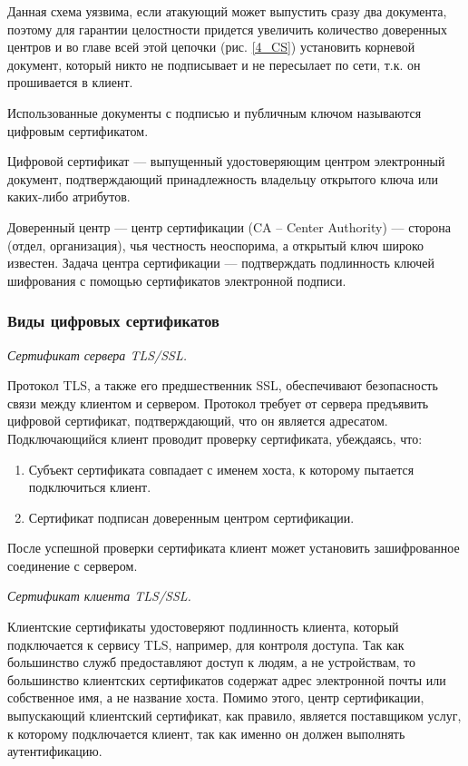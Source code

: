 Данная схема уязвима, если атакующий может выпустить сразу два документа, поэтому для гарантии целостности придется увеличить количество доверенных центров и во главе всей этой цепочки (рис. \ref{4_CS}) установить корневой документ, который никто не подписывает и не пересылает по сети, т.к. он прошивается в клиент.

Использованные документы с подписью и публичным ключом называются цифровым сертификатом.

Цифровой сертификат --- выпущенный удостоверяющим центром электронный документ, подтверждающий принадлежность владельцу открытого ключа или каких-либо атрибутов.

Доверенный центр --- центр сертификации (CA -- Center Authority) --- сторона (отдел, организация), чья честность неоспорима, а открытый ключ широко известен. Задача центра сертификации --- подтверждать подлинность ключей шифрования с помощью сертификатов электронной подписи. 
\newpage

\subsubsection{Виды цифровых сертификатов}

\textit{Сертификат сервера TLS/SSL.}

Протокол TLS, а также его предшественник SSL, обеспечивают безопасность связи между клиентом и сервером. Протокол требует от сервера предъявить цифровой сертификат, подтверждающий, что он является адресатом. Подключающийся клиент проводит проверку сертификата, убеждаясь, что:
\begin{enumerate}
	\item Субъект сертификата совпадает с именем хоста, к которому пытается подключиться клиент.
	\item Сертификат подписан доверенным центром сертификации.
\end{enumerate}
После успешной проверки сертификата клиент может установить зашифрованное соединение с сервером.

\textit{Сертификат клиента TLS/SSL.}

Клиентские сертификаты удостоверяют подлинность клиента, который подключается к сервису TLS, например, для контроля доступа. Так как большинство служб предоставляют доступ к людям, а не устройствам, то большинство клиентских сертификатов содержат адрес электронной почты или собственное имя, а не название хоста. Помимо этого, центр сертификации, выпускающий клиентский сертификат, как правило, является поставщиком услуг, к которому подключается клиент, так как именно он должен выполнять аутентификацию.

